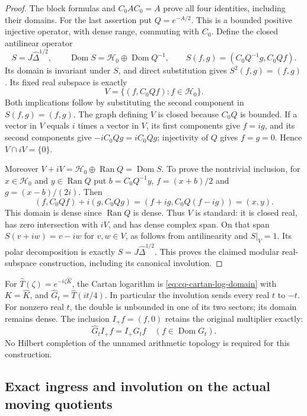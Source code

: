 \begin{proof}
The block formulas and $C_0AC_0=A$ prove all four identities,
including their domains. For the last assertion put $Q=e^{-A/2}$.
This is a bounded positive injective operator, with dense range,
commuting with $C_0$. Define the closed antilinear operator
\[
 S=J\widehat\Delta^{1/2},\qquad
 \operatorname{Dom}S=\mathscr H_0\oplus\operatorname{Dom}Q^{-1},
 \qquad S(f,g)=(C_0Q^{-1}g,C_0Qf).
\]
Its domain is invariant under $S$, and direct substitution gives
$S^2(f,g)=(f,g)$. Its fixed real subspace is exactly
\begin{equation}
 V=\{(f,C_0Qf):f\in\mathscr H_0\}.
 \label{eq:cq-standard-real-heat-space}
\end{equation}
Both implications follow by substituting the second component
in $S(f,g)=(f,g)$. The graph defining $V$ is closed because
$C_0Q$ is bounded. If a vector in $V$ equals $i$ times a vector
in $V$, its first components give $f=ig$, and its second
components give $-iC_0Qg=iC_0Qg$; injectivity of $Q$ gives
$f=g=0$. Hence $V\cap iV=\{0\}$.

Moreover $V+iV=\mathscr H_0\oplus\operatorname{Ran}Q
=\operatorname{Dom}S$. To prove the nontrivial inclusion,
for $x\in\mathscr H_0$ and $y\in\operatorname{Ran}Q$ put
$b=C_0Q^{-1}y$, $f=(x+b)/2$ and $g=(x-b)/(2i)$.
Then
\[
 (f,C_0Qf)+i(g,C_0Qg)
   =(f+ig,C_0Q(f-ig))=(x,y).
\]
This domain is dense since $\operatorname{Ran}Q$ is dense.
Thus $V$ is standard: it is closed real, has zero intersection
with $iV$, and has dense complex span. On that span
$S(v+iw)=v-iw$ for $v,w\in V$, as follows from antilinearity
and $S|_V=1$. Its polar decomposition is exactly
$S=J\widehat\Delta^{1/2}$. This proves the claimed modular
real-subspace construction, including its canonical involution.
\end{proof}

For $\widehat T(\zeta)=e^{-i\zeta\widehat K}$,
the Cartan logarithm is \eqref{eq:cq-cartan-log-domain} with
$K=\widehat K$, and $\widehat G_t=\widehat T(it/4)$.
In particular the involution sends every real $t$ to $-t$.
For nonzero real $t$, the double is unbounded in one of its
two sectors; its domain remains dense. The inclusion
$I_+f=(f,0)$ retains the original multiplier exactly:
\[
 \widehat G_t I_+f=I_+G_tf
       \quad(f\in\operatorname{Dom}G_t).
\]
No Hilbert completion of the unnamed arithmetic topology is
required for this construction.

\subsection{Exact ingress and involution on the actual moving quotients}

